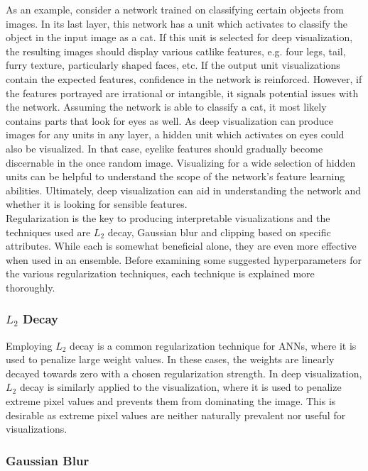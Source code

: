 \noindent As an example, consider a network trained on classifying certain objects from images. In its last layer, this network has a unit which activates to classify the object in the input image as a cat. If this unit is selected for deep visualization, the resulting images should display various catlike features, e.g. four legs, tail, furry texture, particularly shaped faces, etc. If the output unit visualizations contain the expected features, confidence in the network is reinforced. However, if the features portrayed are irrational or intangible, it signals potential issues with the network. Assuming the network is able to classify a cat, it most likely contains parts that look for eyes as well. As deep visualization can produce images for any units in any layer, a hidden unit which activates on eyes could also be visualized. In that case, eyelike features should gradually become discernable in the once random image. Visualizing for a wide selection of hidden units can be helpful to understand the scope of the network's feature learning abilities. Ultimately, deep visualization can aid in understanding the network and whether it is looking for sensible features. \\

\noindent Regularization is the key to producing interpretable visualizations and the techniques used are $L_2$ decay, Gaussian blur and clipping based on specific attributes. While each is somewhat beneficial alone, they are even more effective when used in an ensemble. Before examining some suggested hyperparameters for the various regularization techniques, each technique is explained more thoroughly.

\subsubsection{$L_2$ Decay}

Employing $L_2$ decay is a common regularization technique for ANNs, where it is used to penalize large weight values. In these cases, the weights are linearly decayed towards zero with a chosen regularization strength. In deep visualization, $L_2$ decay is similarly applied to the visualization, where it is used to penalize extreme pixel values and prevents them from dominating the image. This is desirable as extreme pixel values are neither naturally prevalent nor useful for visualizations.

\subsubsection{Gaussian Blur}

